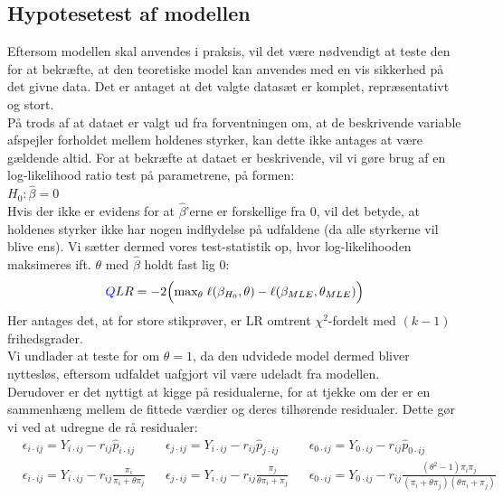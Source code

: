 \documentclass[11pt,a4paper]{article}
\begin{document}
\subsection{Hypotesetest af modellen}
Eftersom modellen skal anvendes i praksis, vil det være nødvendigt at teste den for at bekræfte, at den teoretiske model kan anvendes med en vis sikkerhed på det givne data. Det er antaget at det valgte datasæt er komplet, repræsentativt og stort. \\
På trods af at dataet er valgt ud fra forventningen om, at de beskrivende variable afspejler forholdet mellem holdenes styrker, kan dette ikke antages at være gældende altid. For at bekræfte at dataet er beskrivende, vil vi gøre brug af en log-likelihood ratio test på parametrene, på formen:\\
$H_0: \hat{\beta} = 0$\\
Hvis der ikke er evidens for at $\hat{\beta}$'erne er forskellige fra 0, vil det betyde, at holdenes styrker ikke har nogen indflydelse på udfaldene (da alle styrkerne vil blive ens). Vi sætter dermed vores test-statistik op, hvor log-likelihooden maksimeres ift. $\theta$ med $\hat{\beta}$ holdt fast lig 0:\\
\begin{align*}
\textcolor{blue}{Q} LR = -2\Big{(}\text{max}_\theta \;\ell (\beta_{H_0},\theta)-\ell (\beta_{MLE},\theta_{MLE})\Big{)}
\end{align*}
Her antages det, at for store stikprøver, er LR omtrent $\chi^2$-fordelt med $(k-1)$ frihedsgrader. \\
Vi undlader at teste for om $\theta=1$, da den udvidede model dermed bliver nyttesløs, eftersom udfaldet uafgjort vil være udeladt fra modellen. \\
Derudover er det nyttigt at kigge på residualerne, for at tjekke om der er en sammenhæng mellem de fittede værdier og deres tilhørende residualer. Dette gør vi ved at udregne de rå residualer:
\begin{align*}
&\epsilon_{i\cdot ij}=Y_{i\cdot ij}-r_{ij}\hat{p}_{i\cdot ij}
&&\epsilon_{j\cdot ij}=Y_{i\cdot ij}-r_{ij} \hat{p}_{j\cdot ij}
&&\epsilon_{0\cdot ij}=Y_{0\cdot ij}-r_{ij} \hat{p}_{0\cdot ij}\\
&\epsilon_{i\cdot ij}=Y_{i\cdot ij}-r_{ij} \frac{\pi_i}{\pi_i+\theta \pi_j}
&&\epsilon_{j\cdot ij}=Y_{i\cdot ij}-r_{ij} \frac{\pi_j}{\theta \pi_i+ \pi_j}
&&\epsilon_{0\cdot ij}=Y_{0\cdot ij}-r_{ij} \frac{(\theta^2-1)\pi_i\pi_j}{(\pi_i+\theta \pi_j)(\theta
\pi_i + \pi_j)}\\
\end{align*}
\end{document}
